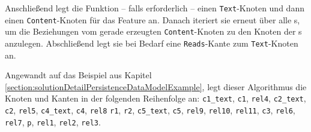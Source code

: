     

    Anschließend legt die Funktion -- falls erforderlich -- einen \texttt{Text}-Knoten und dann einen \texttt{Content}-Knoten
    für das Feature an.
    Danach iteriert sie erneut über alle {\childFeature}s, um die Beziehungen vom
    gerade erzeugten \texttt{Content}-Knoten zu den Knoten der {\childFeature}s anzulegen.
    Abschließend legt sie bei Bedarf eine \texttt{Reads}-Kante zum \texttt{Text}-Knoten an.

    Angewandt auf das Beispiel aus Kapitel \ref{section:solutionDetailPersistenceDataModelExample},
    legt dieser Algorithmus die Knoten und Kanten in der folgenden Reihenfolge an:
    \texttt{c1\_text}, \texttt{c1}, \texttt{rel4},
    \texttt{c2\_text}, \texttt{c2}, \texttt{rel5},
    \texttt{c4\_text}, \texttt{c4}, \texttt{rel8}
    \texttt{r1}, \texttt{r2}, \texttt{c5\_text}, \texttt{c5},
    \texttt{rel9}, \texttt{rel10}, \texttt{rel11},
    \texttt{c3}, \texttt{rel6}, \texttt{rel7},
    \texttt{p}, \texttt{rel1}, \texttt{rel2}, \texttt{rel3}.